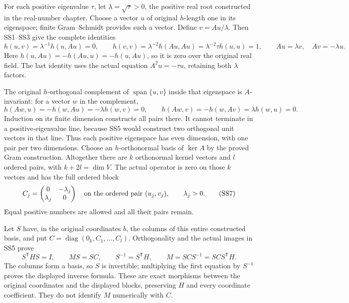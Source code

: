 \documentclass[
  11pt,
]{article}
\begin{document}
For each positive eigenvalue \(\tau\), let \(\lambda=\sqrt{\tau}>0\),
the positive real root constructed in the real-number chapter. Choose a
vector \(u\) of original \(h\)-length one in its eigenspace; finite
Gram--Schmidt provides such a vector. Define \(v=Au/\lambda\). Then
SS1--SS3 give the complete identities \[
h(u,v)=\lambda^{-1}h(u,Au)=0,\qquad
h(v,v)=\lambda^{-2}h(Au,Au)
=\lambda^{-2}\tau h(u,u)=1,
\qquad Au=\lambda v,\quad Av=-\lambda u.
\tag{SS5}
\] Here \(h(u,Au)=-h(Au,u)=-h(u,Au)\), so it is zero over the original
real field. The last identity uses the actual equation \(A^2u=-\tau u\),
retaining both \(\lambda\) factors.

The original \(h\)-orthogonal complement of
\(\operatorname{span}\{u,v\}\) inside that eigenspace is
\(A\)-invariant: for a vector \(w\) in the complement, \[
h(Aw,u)=-h(w,Au)=-\lambda h(w,v)=0,\qquad
h(Aw,v)=-h(w,Av)=\lambda h(w,u)=0.
\tag{SS6}
\] Induction on its finite dimension constructs all pairs there. It
cannot terminate in a positive-eigenvalue line, because SS5 would
construct two orthogonal unit vectors in that line. Thus each positive
eigenspace has even dimension, with one pair per two dimensions. Choose
an \(h\)-orthonormal basis of \(\ker A\) by the proved Gram
construction. Altogether there are \(k\) orthonormal kernel vectors and
\(l\) ordered pairs, with \(k+2l=\dim V\). The actual operator is zero
on those \(k\) vectors and has the full ordered block \[
C_j=\begin{pmatrix}0&-\lambda_j\\ \lambda_j&0\end{pmatrix}
\quad\hbox{on the ordered pair }(u_j,v_j),\qquad
\lambda_j>0.
\tag{SS7}
\] Equal positive numbers are allowed and all their pairs remain.

Let \(S\) have, in the original coordinates \(b\), the columns of this
entire constructed basis, and put
\(C=\operatorname{diag}(0_k,C_1,\ldots,C_l)\). Orthogonality and the
actual images in SS5 prove \[
S^{\mathsf T}HS=I,\qquad MS=SC,\qquad
S^{-1}=S^{\mathsf T}H,\qquad
M=SCS^{-1}=SC S^{\mathsf T}H.
\tag{SS8}
\] The columns form a basis, so \(S\) is invertible; multiplying the
first equation by \(S^{-1}\) proves the displayed inverse formula. These
are exact morphisms between the original coordinates and the displayed
blocks, preserving \(H\) and every coordinate coefficient. They do not
identify \(M\) numerically with \(C\).
\end{document}
